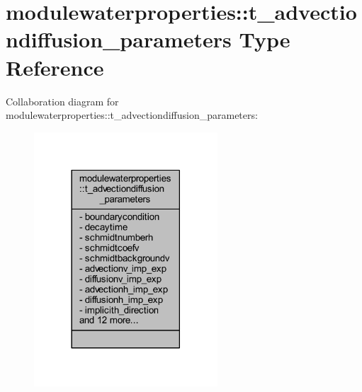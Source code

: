 \hypertarget{structmodulewaterproperties_1_1t__advectiondiffusion__parameters}{}\section{modulewaterproperties\+:\+:t\+\_\+advectiondiffusion\+\_\+parameters Type Reference}
\label{structmodulewaterproperties_1_1t__advectiondiffusion__parameters}


Collaboration diagram for modulewaterproperties\+:\+:t\+\_\+advectiondiffusion\+\_\+parameters\+:\nopagebreak
\begin{figure}[H]
\begin{center}
\leavevmode
\includegraphics[width=194pt]{structmodulewaterproperties_1_1t__advectiondiffusion__parameters__coll__graph}
\end{center}
\end{figure}
